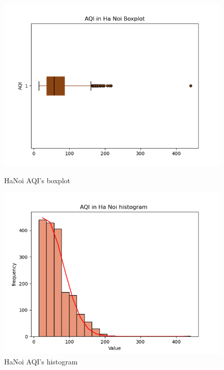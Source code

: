 \documentclass[conference]{IEEEtran}
\begin{document}
\begin{figure}[H]
    \centering
    \begin{minipage}{0.23\textwidth}
        \centering
        \includegraphics[width=1\textwidth]{bibliography/figure/Analysis-Dataset/BoxplotHaNoi.png}
        \caption{HaNoi AQI's boxplot}
        \label{fig:1}
    \end{minipage}
    \hfill
    \begin{minipage}{0.23\textwidth}
        \centering
        \includegraphics[width=1\textwidth]{bibliography/figure/Analysis-Dataset/histogramHaNoi.png}
        \caption{HaNoi AQI's histogram}
        \label{fig:2}
    \end{minipage}
\end{figure}
\end{document}
